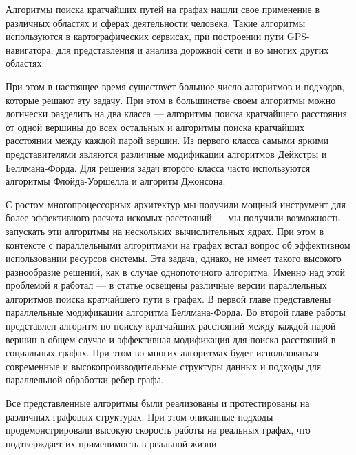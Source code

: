 \startprefacepage

Алгоритмы поиска кратчайших путей на графах нашли свое применение в различных областях и сферах деятельности человека. Такие алгоритмы используются в картографических сервисах, при построении пути GPS-навигатора, для представления и анализа дорожной сети и во многих других областях.
 
При этом в настоящее время существует большое число алгоритмов и подходов, которые решают эту задачу. При этом в большинстве своем алгоритмы можно логически разделить на два класса --- алгоритмы поиска кратчайшего расстояния от одной вершины до всех остальных и алгоритмы поиска кратчайших расстоянии между каждой парой вершин. Из первого класса самыми яркими представителями являются различные модификации алгоритмов Дейкстры и Беллмана-Форда. Для решения задач второго класса часто используются алгоритмы Флойда-Уоршелла и алгоритм Джонсона. 

С ростом многопроцессорных архитектур мы получили мощный инструмент для более эффективного расчета искомых расстояний --- мы получили возможность запускать эти алгоритмы на нескольких вычислительных ядрах. При этом в контексте с параллельными алгоритмами на графах встал вопрос об эффективном использовании ресурсов системы. Эта задача, однако, не имеет такого высокого разнообразие решений, как в случае однопоточного алгоритма. Именно над этой проблемой я работал --- в статье освещены различные версии параллельных алгоритмов поиска кратчайшего пути в графах. В первой главе представлены параллельные модификации алгоритма Беллмана-Форда. Во второй главе работы представлен алгоритм по поиску кратчайших расстояний между каждой парой вершин в общем случае и эффективная модификация для поиска расстояний в социальных графах. При этом во многих алгоритмах будет использоваться современные и высокопроизводительные структуры данных и подходы для параллельной обработки ребер графа.

Все представленные алгоритмы были реализованы и протестированы на различных графовых структурах. При этом описанные подходы продемонстрировали высокую скорость работы на реальных графах, что подтверждает их применимость в реальной жизни.
\FloatBarrier
